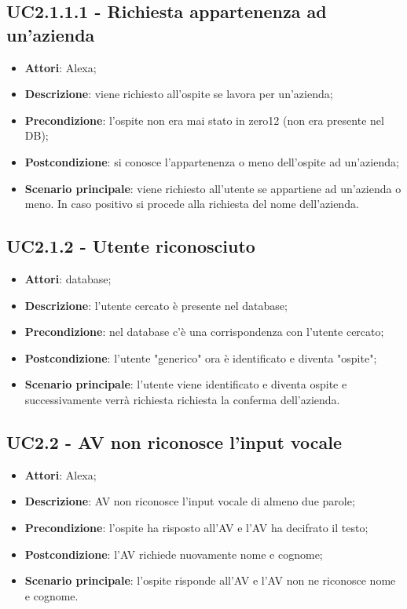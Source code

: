 \documentclass[../AnalisiDeiRequisiti.tex]{subfiles}
\begin{document}
\subsection{UC2.1.1.1 - Richiesta appartenenza ad un'azienda} 
\label{sssec:UC2.1.1.1} 
\begin{itemize} 
\item \textbf{Attori}: Alexa;
\item \textbf{Descrizione}: viene richiesto all'ospite se lavora per un'azienda;
\item \textbf{Precondizione}: l'ospite non era mai stato in zero12 (non era presente nel DB);
\item \textbf{Postcondizione}: si conosce l'appartenenza o meno dell'ospite ad un'azienda;
\item \textbf{Scenario principale}: viene richiesto all'utente se appartiene ad un'azienda o meno. In caso positivo si procede alla richiesta del nome dell'azienda.\end{itemize} 
\subsection{UC2.1.2 - Utente riconosciuto} 
\label{sssec:UC2.1.2} 
\begin{itemize} 
\item \textbf{Attori}: database;
\item \textbf{Descrizione}: l'utente cercato è presente nel database;
\item \textbf{Precondizione}: nel database c'è una corrispondenza con l'utente cercato;
\item \textbf{Postcondizione}: l'utente "generico" ora è identificato e diventa "ospite";
\item \textbf{Scenario principale}: l'utente viene identificato e diventa ospite e successivamente verrà richiesta richiesta la conferma dell'azienda.\end{itemize} 
\subsection{UC2.2 - AV non riconosce l'input vocale} 
\label{sssec:UC2.2} 
\begin{itemize} 
\item \textbf{Attori}: Alexa;
\item \textbf{Descrizione}: AV non riconosce l'input vocale di almeno due parole;
\item \textbf{Precondizione}: l'ospite ha risposto all'AV e l'AV ha decifrato il testo;
\item \textbf{Postcondizione}: l'AV richiede nuovamente nome e cognome;
\item \textbf{Scenario principale}: l'ospite risponde all'AV e l'AV non ne riconosce nome e cognome.\end{itemize} 
\end{document}
